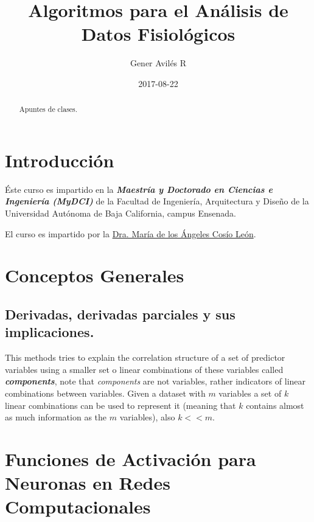 \documentclass[]{book}
\title{Algoritmos para el Análisis de Datos Fisiológicos}
\author{Gener Avilés R}
\date{2017-08-22}
\begin{document}
\maketitle
\begin{abstract}
Apuntes de clases.
\end{abstract}

{
\setcounter{tocdepth}{1}
\tableofcontents
}
\chapter{Introducción}\label{introduccion}

Éste curso es impartido en la \textbf{\emph{Maestría y Doctorado en
Ciencias e Ingeniería (MyDCI)}} de la Facultad de Ingeniería,
Arquitectura y Diseño de la Universidad Autónoma de Baja California,
campus Ensenada.

El curso es impartido por la
\href{https://www.researchgate.net/profile/Maria_Cosio_Leon}{Dra. María
de los Ángeles Cosío León}.

\chapter{Conceptos Generales}\label{intro}

\section{Derivadas, derivadas parciales y sus
implicaciones.}\label{derivadas-derivadas-parciales-y-sus-implicaciones.}

This methods tries to explain the correlation structure of a set of
predictor variables using a smaller set o linear combinations of these
variables called \textbf{\emph{components}}, note that \emph{components}
are not variables, rather indicators of linear combinations between
variables. Given a dataset with \(m\) variables a set of \(k\) linear
combinations can be used to represent it (meaning that \(k\) contains
almost as much information as the \(m\) variables), also \(k<<m\).

\chapter{Funciones de Activación para Neuronas en Redes
Computacionales}\label{funciones-de-activacion-para-neuronas-en-redes-computacionales}
\end{document}
